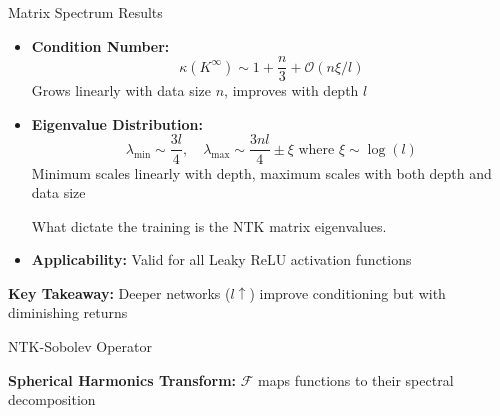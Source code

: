 \documentclass{beamer}
\begin{document}
\begin{frame}{Matrix Spectrum Results}
\begin{itemize}
\item \textbf{Condition Number:}
  \[ \kappa(K^{\infty}) \sim 1 + \frac{n}{3} + \mathcal{O}(n \xi / l) \]
  Grows linearly with data size $n$, improves with depth $l$

\item \textbf{Eigenvalue Distribution:}
  \[ \lambda_{\text{min}} \sim \frac{3l}{4}, \quad \lambda_{\text{max}} \sim \frac{3nl}{4} \pm \xi \text{ where } \xi \sim \log(l) \]
  Minimum scales linearly with depth, maximum scales with both depth and data size

What dictate the training is the NTK matrix eigenvalues.

\item \textbf{Applicability:} Valid for all Leaky ReLU activation functions
\end{itemize}

\textbf{Key Takeaway:} Deeper networks ($l \uparrow$) improve conditioning but with diminishing returns
\end{frame}

\begin{frame}{NTK-Sobolev Operator}
    \begin{center}
    \end{center}

    \vspace{0.5em}
    \textbf{Spherical Harmonics Transform:} $\mathcal{F}$ maps functions to their spectral decomposition
    
    \end{frame}
\end{document}
